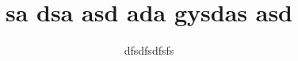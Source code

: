 \documentclass[series=CorpusAvesticum,gitver=true,PhD=false,showgrid]{brill}
\begin{document}

\frontmatter
\title{sa dsa asd ada gysdas asd}
\author{dfsdfsdfsfs}
\maketitle
\tableofcontents
\mainmatter
%

\printabbreviationsac





%
%
%
%
\printabbreviations
\end{document}
